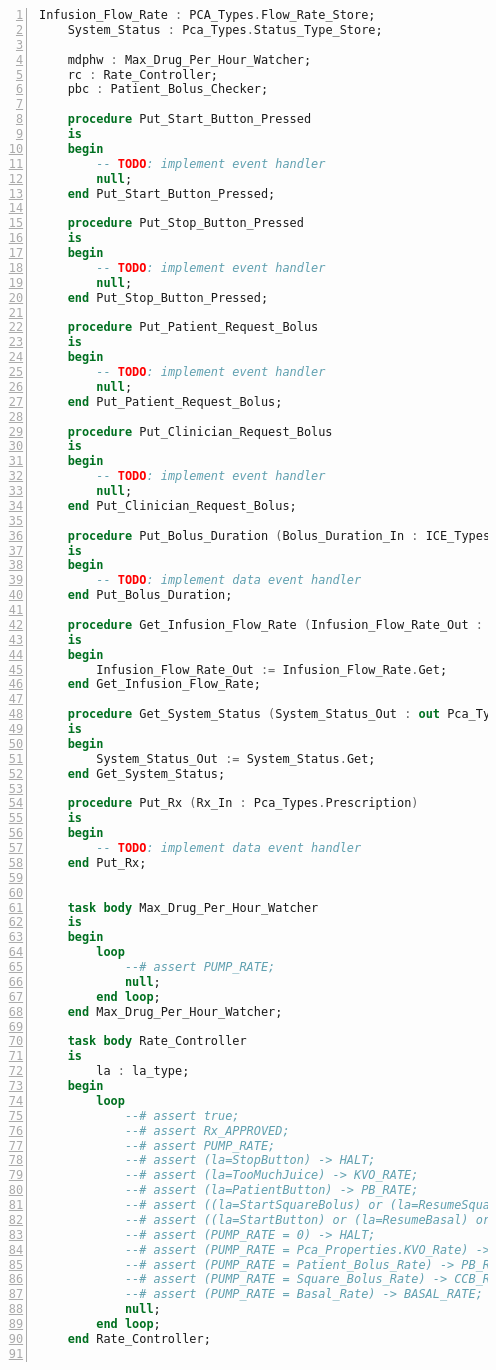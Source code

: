 \begin{lstlisting}[language=ada, gobble=0, numbers=left, caption={\lstinline{Pca_Operation} package}, label={listing:pca_generated:pca_operation}]
    Infusion_Flow_Rate : PCA_Types.Flow_Rate_Store;
    System_Status : Pca_Types.Status_Type_Store;

    mdphw : Max_Drug_Per_Hour_Watcher;
    rc : Rate_Controller;
    pbc : Patient_Bolus_Checker;

    procedure Put_Start_Button_Pressed
    is
    begin
        -- TODO: implement event handler
        null;
    end Put_Start_Button_Pressed;

    procedure Put_Stop_Button_Pressed
    is
    begin
        -- TODO: implement event handler
        null;
    end Put_Stop_Button_Pressed;

    procedure Put_Patient_Request_Bolus
    is
    begin
        -- TODO: implement event handler
        null;
    end Put_Patient_Request_Bolus;

    procedure Put_Clinician_Request_Bolus
    is
    begin
        -- TODO: implement event handler
        null;
    end Put_Clinician_Request_Bolus;

    procedure Put_Bolus_Duration (Bolus_Duration_In : ICE_Types.Minute)
    is
    begin
        -- TODO: implement data event handler
    end Put_Bolus_Duration;

    procedure Get_Infusion_Flow_Rate (Infusion_Flow_Rate_Out : out Pca_Types.Flow_Rate)
    is
    begin
        Infusion_Flow_Rate_Out := Infusion_Flow_Rate.Get;
    end Get_Infusion_Flow_Rate;

    procedure Get_System_Status (System_Status_Out : out Pca_Types.Status_Type)
    is
    begin
        System_Status_Out := System_Status.Get;
    end Get_System_Status;

    procedure Put_Rx (Rx_In : Pca_Types.Prescription)
    is
    begin
        -- TODO: implement data event handler
    end Put_Rx;


    task body Max_Drug_Per_Hour_Watcher
    is
    begin
        loop
            --# assert PUMP_RATE;
            null;
        end loop;
    end Max_Drug_Per_Hour_Watcher;

    task body Rate_Controller
    is
        la : la_type;
    begin
        loop
            --# assert true;
            --# assert Rx_APPROVED;
            --# assert PUMP_RATE;
            --# assert (la=StopButton) -> HALT;
            --# assert (la=TooMuchJuice) -> KVO_RATE;
            --# assert (la=PatientButton) -> PB_RATE;
            --# assert ((la=StartSquareBolus) or (la=ResumeSquareBolus)) -> CCB_RATE;
            --# assert ((la=StartButton) or (la=ResumeBasal) or (la=SquareBolusDone)) -> BASAL_RATE;
            --# assert (PUMP_RATE = 0) -> HALT;
            --# assert (PUMP_RATE = Pca_Properties.KVO_Rate) -> KVO_RATE;
            --# assert (PUMP_RATE = Patient_Bolus_Rate) -> PB_RATE;
            --# assert (PUMP_RATE = Square_Bolus_Rate) -> CCB_RRATE;
            --# assert (PUMP_RATE = Basal_Rate) -> BASAL_RATE;
            null;
        end loop;
    end Rate_Controller;


\end{lstlisting}
